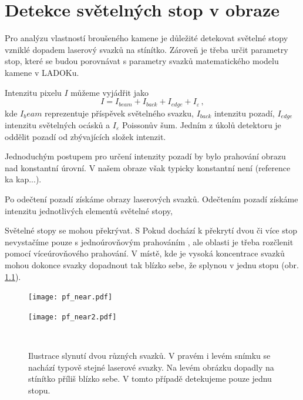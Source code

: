 \chapter{Detekce světelných stop v obraze}
Pro analýzu vlastností broušeného kamene je důležité detekovat světelné stopy vzniklé dopadem laserový svazků na stínítko. Zároveň je třeba určit parametry stop, které se budou porovnávat s parametry svazků matematického modelu kamene v LADOKu. 

Intenzitu pixelu $I$ můžeme vyjádřit jako 
\begin{equation}
	I = I_{beam}+I_{back}+I_{edge}+I_{\varepsilon}\,,
	\label{eq:intensitu_sum}
\end{equation}
 kde $I_beam$ reprezentuje příspěvek světelného svazku, $I_{back}$ intenzitu pozadí, $I_{edge}$ intenzitu světelných ocásků a $I_{\varepsilon}$ Poissonův šum. Jedním z úkolů detektoru je oddělit pozadí od zbývajících složek intenzit.    
 
Jednoduchým postupem pro určení intenzity pozadí by bylo prahování obrazu nad konstantní úrovní. V našem obraze však typicky konstantní není (reference ka kap...). 

Po odečtení pozadí získáme obrazy laserových svazků.  
Odečtením pozadí získáme intenzitu jednotlivých elementů světelné stopy, 

Světelné stopy se mohou překrývat. S Pokud dochází k překrytí dvou či více stop nevystačíme pouze s jednoúrovňovým prahováním \cite{Drapela}, ale oblasti je třeba rozčlenit pomocí víceúrovňového prahování. V místě, kde je vysoká koncentrace svazků mohou dokonce svazky dopadnout tak blízko sebe, že splynou v jednu stopu (obr. \ref{Splynuti}).  

\begin{figure}[htbp]
    \centering
    \begin{minipage}[c]{0.48\textwidth}
        \centering\texttt{[image: pf\_near.pdf]}
    \end{minipage}
    \begin{minipage}[c]{0.48\textwidth}
        \centering\texttt{[image: pf\_near2.pdf]}
    \end{minipage}
    \\
        \caption[Slynutí dvou různých svazků.]{Ilustrace slynutí dvou různých svazků. V pravém i levém snímku se nachází typově stejné laserové svazky. Na levém obrázku dopadly na stínítko příliš blízko sebe. V tomto případě detekujeme pouze jednu stopu.}
        \label{Splynuti}
\end{figure}

